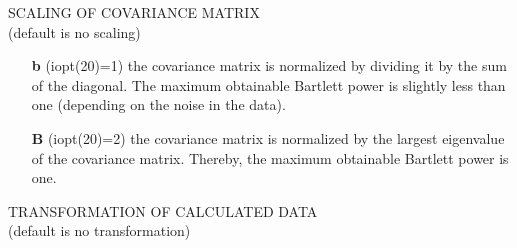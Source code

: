 \documentclass{saclantc}
\begin{document}
\noindent SCALING OF COVARIANCE MATRIX\\
(default is no scaling)
\vspace{-0.6cm}
\begin{itemize}
    \item[{\bf b}] (iopt(20)=1)   the 
covariance matrix is normalized by dividing it by the sum of the
 diagonal. The maximum obtainable 
 Bartlett power is slightly less than one (depending on the noise in the data).
\vspace{-0.3cm}
    \item[{\bf B}] (iopt(20)=2)   the 
covariance matrix is normalized by the largest eigenvalue of 
the covariance matrix. Thereby, the maximum obtainable  Bartlett power is one.
\end{itemize}

\noindent TRANSFORMATION OF CALCULATED DATA\\
(default is no transformation)
\vspace{-0.6cm}
\end{document}
